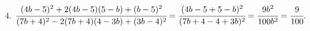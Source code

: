 4. $\cfrac{(4b-5)^2+2(4b-5)(5-b)+(b-5)^2}{(7b+4)^2-2(7b+4)(4-3b)+(3b-4)^2}=
\cfrac{(4b-5+5-b)^2}{(7b+4-4+3b)^2}=\cfrac{9b^2}{100b^2}=\cfrac{9}{100}.$\\
